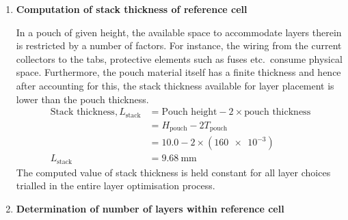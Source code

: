 \begin{enumerate}[ label=\textbf{\arabic*}), leftmargin=0pt, itemindent=20pt, labelwidth=15pt, labelsep=5pt, listparindent=0.7cm, align=left]
        In       the        case       of       the        reference       cell
        under       consideration,       the      areal       capacity       is
        \begin{equation}
            \text{Areal capacity of reference cell } = \frac{\SI{60000}{\milli\amphour}}{\SI{20527}{\centi\meter\squared}}  = \SI{2.92}{\milli\amphour\per\centi\meter\squared}
        \end{equation}
        which is  close to the desired  value in automotive applications  as per
        the recommendations  in Gr\"oger~\etal.  Considering that  the reference
        cell is based on the high  energy density Chevrolet Bolt \gls{bev} cell,
        a pouch height of \SI{10}{\milli\meter} is justifiable for this task and
        is reported  in \cref{tbl:lcoSimParamslayeropt}. As per  the assumptions
        discussed  in  \cref{subsec:layeroptassumptions},  this  value  is  held
        constant throughout the layer optimisation process.

    \item \hypertarget{stackthickness}{\textbf{Computation of stack thickness of reference cell}}

        In a  pouch of given height,  the available space to  accommodate layers
        therein is restricted  by a number of factors. For  instance, the wiring
        from the  current collectors  to the tabs,  protective elements  such as
        fuses  etc.\ consume  physical  space. Furthermore,  the pouch  material
        itself has a  finite thickness and hence after accounting  for this, the
        stack thickness  available for layer  placement is lower than  the pouch
        thickness.
        \begin{align}
            \text{Stack thickness}, L_\text{stack} & = \text{Pouch height} - 2\times \text{pouch thickness} \\
                                                   & = H_\text{pouch} - 2 T_\text{pouch}                    \\
                                                   & = 10.0 - 2\times(\num{160e-3})                         \\
            L_\text{stack}                         & = \SI{9.68}{\milli\meter}
        \end{align}
        The computed  value of stack  thickness is  held constant for  all layer
        choices trialled in the entire layer optimisation process.

    \item \textbf{Determination of number  of layers within  reference cell}


\end{enumerate}

